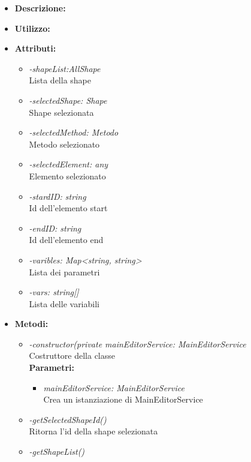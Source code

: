 \begin{itemize}
	\item \textbf{Descrizione:}\\
	
	\item \textbf{Utilizzo:}\\
	
	\item \textbf{Attributi:}
		\begin{itemize}
			\item \emph{-shapeList:AllShape}\\
			Lista della shape
			\item \emph{-selectedShape: Shape}\\
			Shape selezionata
			\item \emph{-selectedMethod: Metodo}\\
			Metodo selezionato
			\item \emph{-selectedElement: any}\\
			Elemento selezionato
			\item \emph{-stardID: string}\\
			Id dell'elemento start
			\item \emph{-endID: string}\\
			Id dell'elemento end
			\item \emph{-varibles: Map<string, string>}\\
			Lista dei parametri
			\item \emph{-vars: string[]}\\
			Lista delle variabili
		\end{itemize}
	\item \textbf{Metodi:}
		\begin{itemize}
			\item \emph{-constructor(private mainEditorService: MainEditorService}\\
    		Costruttore della classe\\
    		\textbf{Parametri:}
    		\begin{itemize}
    			\item \emph{mainEditorService: MainEditorService}\\
    			Crea un istanziazione di MainEditorService
    		\end{itemize}
    		\item \emph{-getSelectedShapeId()}\\
    		Ritorna l'id della shape selezionata
    		\item \emph{-getShapeList()}\\

\end{itemize}
\end{itemize}

